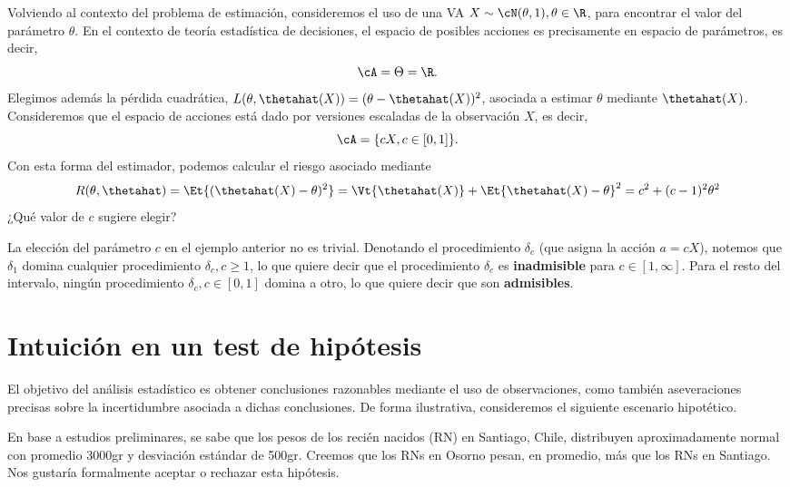 \begin{example}
	Volviendo al contexto del problema de estimación, consideremos el uso de una VA $X\sim\cN(\theta,1), \theta\in\R$, para encontrar el valor del parámetro $\theta$. En el contexto de teoría estadística de decisiones, el espacio de posibles acciones es precisamente en espacio de parámetros, es decir, 
	\begin{equation}
		\cA = \Theta = \R.
	\end{equation}
	Elegimos además la pérdida cuadrática, $L(\theta,\thetahat(X)) = (\theta-\thetahat(X))^2$, asociada a estimar $\theta$ mediante $\thetahat(X)$. Consideremos que el espacio de acciones está dado por versiones escaladas de la observación $X$, es decir, 
	\begin{equation}
		\cA = \{cX, c\in[0,1]\}.
	\end{equation}
	Con esta forma del estimador, podemos calcular el riesgo asociado mediante  
	\begin{equation}
		R(\theta,\thetahat)= \Et{(\thetahat(X)-\theta)^2} = \Vt{\thetahat(X)} + \Et{\thetahat(X)-\theta}^2 = c^2 + (c-1)^2\theta^2
	\end{equation}
	¿Qué valor de $c$ sugiere elegir?
\end{example}

\begin{remark}
    La elección del parámetro $c$ en el ejemplo anterior no es trivial. Denotando el procedimiento $\delta_c$ (que asigna la acción $a=cX$), notemos que $\delta_1$ domina cualquier procedimiento $\delta_c,c\geq 1$, lo que quiere decir que el procedimiento $\delta_c$ es \textbf{inadmisible} para $c\in[1,\infty]$. Para el resto del intervalo, ningún procedimiento  $\delta_c,c\in [0,1]$ domina a otro, lo que quiere decir que son   \textbf{admisibles}.   
\end{remark}

\section{Intuición en un test de hipótesis} 
\label{sec:int_hipótesis}

El objetivo del análisis estadístico es obtener conclusiones razonables mediante el uso de observaciones, como también aseveraciones precisas sobre la incertidumbre asociada a dichas conclusiones. De forma ilustrativa, consideremos el siguiente escenario hipotético.

En base a estudios preliminares, se sabe que los pesos de los recién nacidos (RN) en Santiago, Chile, distribuyen aproximadamente normal con promedio 3000gr y desviación estándar de 500gr. Creemos que los RNs en Osorno pesan, en promedio, más que los RNs en Santiago. Nos gustaría formalmente aceptar o rechazar esta hipótesis. 

